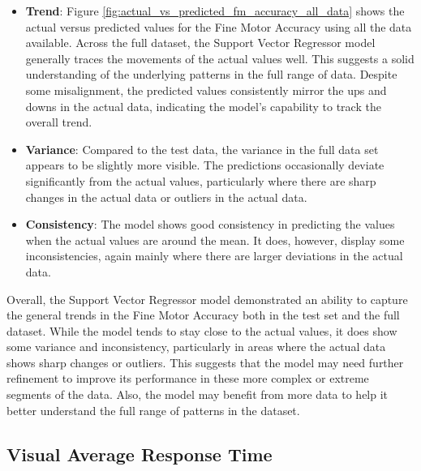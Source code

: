 \begin{itemize}
    \item \textbf{Trend}: Figure \ref{fig:actual_vs_predicted_fm_accuracy_all_data} shows the actual versus predicted values for the Fine Motor Accuracy using all the data available. 
    Across the full dataset, the Support Vector Regressor model generally traces the movements of the actual values well. This suggests a solid understanding of the underlying patterns
    in the full range of data. Despite some misalignment, the predicted values consistently mirror the ups and downs in the actual data, indicating the model's capability to track the 
    overall trend.
    \item \textbf{Variance}: Compared to the test data, the variance in the full data set appears to be slightly more visible. The predictions occasionally deviate significantly from the
    actual values, particularly where there are sharp changes in the actual data or outliers in the actual data.
    \item \textbf{Consistency}: The model shows good consistency in predicting the values when the actual values are around the mean. It does, however, display some inconsistencies, again
    mainly where there are larger deviations in the actual data.    
\end{itemize}

Overall, the Support Vector Regressor model demonstrated an ability to capture the general trends in the Fine Motor Accuracy both in the test set and the full dataset. While the model tends
to stay close to the actual values, it does show some variance and inconsistency, particularly in areas where the actual data shows sharp changes or outliers. This suggests that the
model may need further refinement to improve its performance in these more complex or extreme segments of the data. Also, the model may benefit from more data to help it better understand
the full range of patterns in the dataset.

\subsection*{Visual Average Response Time}

